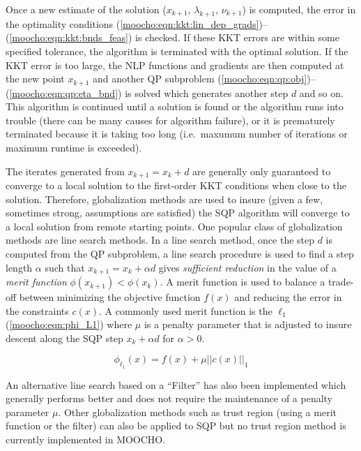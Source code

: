 \documentclass[pdf,ps2pdf,11pt]{SANDreport}
\begin{document}
{{Once a new estimate of the solution ($x_{k+1}$, $\lambda_{k+1}$, $\nu_{k+1}$)
is computed, the error in the optimality conditions
(\ref{moocho:eqn:kkt:lin_dep_grads})--(\ref{moocho:eqn:kkt:bnds_feas}) is
checked.  If these KKT errors are within some specified tolerance, the
algorithm is terminated with the optimal solution.  If the KKT error is too
large, the NLP functions and gradients are then computed at the new point
$x_{k+1}$ and another QP subproblem
(\ref{moocho:eqn:qp:obj})--(\ref{moocho:eqn:qp:eta_bnd}) is solved which
generates another step $d$ and so on.  This algorithm is continued until a
solution is found or the algorithm runs into trouble (there can be many causes
for algorithm failure), or it is prematurely terminated because it is taking
too long (i.e.\ maxumum number of iterations or maximum runtime is exceeded).

The iterates generated from $x_{k+1} = x_k + d$ are generally only guaranteed
to converge to a local solution to the first-order KKT conditions when close
to the solution.  Therefore, globalization methods are used to insure (given a
few, sometimes strong, assumptions are satisfied) the SQP algorithm will
converge to a local solution from remote starting points.  One popular class
of globalization methods are line search methods.  In a line search method,
once the step $d$ is computed from the QP subproblem, a line search procedure
is used to find a step length $\alpha$ such that $x_{k+1} = x_k + {}\alpha d$
gives {\em sufficient reduction} in the value of a {\em merit function}
$\phi(x_{k+1}) < \phi(x_k)$.  A merit function is used to balance a trade-off
between minimizing the objective function $f(x)$ and reducing the error in the
constraints $c(x)$.  A commonly used merit function is the $\ell_1$
(\ref{moocho:eqn:phi_L1}) where $\mu$ is a penalty parameter that is adjusted
to insure descent along the SQP step $x_k + \alpha d$ for $\alpha > 0$.

{\bsinglespace
\begin{equation}
\phi_{\ell_1}(x) = f(x) + \mu ||c(x)||_1
\label{moocho:eqn:phi_L1}
\end{equation}
\esinglespace}

An alternative line search based on a ``Filter'' has also been implemented
which generally performs better and does not require the maintenance of a
penalty parameter $\mu$.  Other globalization methods such as trust region
(using a merit function or the filter) can also be applied to SQP but no trust
region method is currently implemented in MOOCHO.

}}
\end{document}

